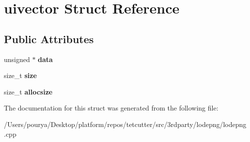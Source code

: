 \hypertarget{structuivector}{}\section{uivector Struct Reference}
\label{structuivector}
\subsection*{Public Attributes}
\begin{DoxyCompactItemize}
\item 
\hypertarget{structuivector_a427d761df4bb4f0f19b4a973fc224c78}{}unsigned $\ast$ {\bfseries data}\label{structuivector_a427d761df4bb4f0f19b4a973fc224c78}

\item 
\hypertarget{structuivector_aa999025945f0c93d0461192475ae2720}{}size\+\_\+t {\bfseries size}\label{structuivector_aa999025945f0c93d0461192475ae2720}

\item 
\hypertarget{structuivector_aac0395a9ad397ae7a28219561ab49ffa}{}size\+\_\+t {\bfseries allocsize}\label{structuivector_aac0395a9ad397ae7a28219561ab49ffa}

\end{DoxyCompactItemize}


The documentation for this struct was generated from the following file\+:\begin{DoxyCompactItemize}
\item 
/\+Users/pourya/\+Desktop/platform/repos/tetcutter/src/3rdparty/lodepng/lodepng.\+cpp\end{DoxyCompactItemize}
